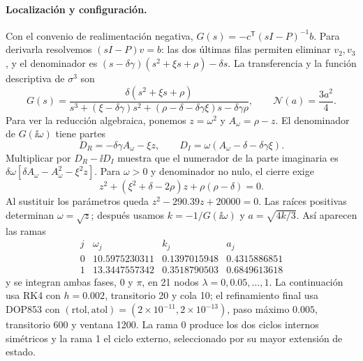 \paragraph{Localización y configuración.}
Con el convenio de realimentación negativa,
\(G(s)=-c^{\mathsf T}(sI-P)^{-1}b\). Para derivarla resolvemos
\((sI-P)v=b\): las dos últimas filas permiten eliminar \(v_2,v_3\),
y el denominador es \((s-\delta\gamma)(s^2+\xi s+\rho)-\delta s\).
La transferencia y la función descriptiva de \(\sigma^3\) son
\begin{equation}
 G(s)=\frac{\delta(s^2+\xi s+\rho)}
 {s^3+(\xi-\delta\gamma)s^2+
 (\rho-\delta-\delta\gamma\xi)s-\delta\gamma\rho},
 \qquad \mathcal N(a)=\frac{3a^2}{4}.
 \label{ncbench:eq:mavpd-transfer}
\end{equation}
Para ver la reducción algebraica, ponemos \(z=\omega^2\) y
\(A_\omega=\rho-z\). El denominador de \(G(\ii\omega)\) tiene partes
\[
 D_R=-\delta\gamma A_\omega-\xi z,\qquad
 D_I=\omega(A_\omega-\delta-\delta\gamma\xi).
\]
Multiplicar por \(D_R-\ii D_I\) muestra que el numerador de la parte
imaginaria es
\(\delta\omega[\delta A_\omega-A_\omega^2-\xi^2z]\).
Para \(\omega>0\) y denominador no nulo, el cierre exige
\[
 z^2+(\xi^2+\delta-2\rho)z+\rho(\rho-\delta)=0.
\]
Al sustituir los parámetros queda \(z^2-290.39z+20000=0\). Las raíces
positivas determinan \(\omega=\sqrt z\); después usamos
\(k=-1/G(\ii\omega)\) y \(a=\sqrt{4k/3}\). Así aparecen las ramas
\begin{equation}
 \begin{array}{c|ccc}
 j&\omega_j&k_j&a_j\\ \hline
 0&10.5975230311&0.1397015948&0.4315886851\\
 1&13.3447557342&0.3518790503&0.6849613618
 \end{array}
 \label{ncbench:eq:mavpd-periodic-branches}
\end{equation}
y se integran ambas fases, \(0\) y \(\pi\), en 21 nodos
\(\lambda=0,0.05,\ldots,1\). La continuación usa RK4 con \(h=0.002\),
transitorio 20 y cola 10; el refinamiento final usa DOP853 con
\((\mathrm{rtol},\mathrm{atol})=(2\times10^{-11},2\times10^{-13})\), paso
máximo \(0.005\), transitorio 600 y ventana 1200. La rama 0 produce los dos
ciclos internos simétricos y la rama 1 el ciclo externo, seleccionado por su
mayor extensión de estado.

